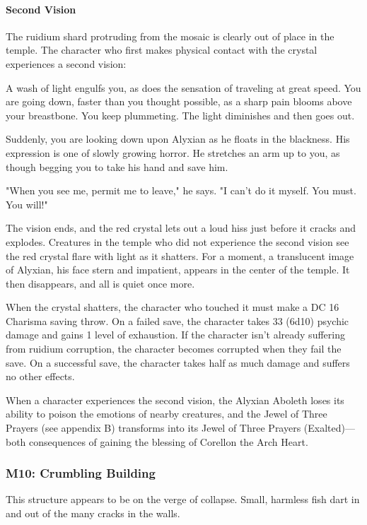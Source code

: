 \documentclass[10pt,a4paper,twoside,twocolumn,openany,nodeprecatedcode]{dndbook}
\begin{document}
\paragraph{Second Vision}
The ruidium shard protruding from the mosaic is clearly out of place in the temple. The character who first makes physical contact with the crystal experiences a second vision:

\begin{DndReadAloud}{}
A wash of light engulfs you, as does the sensation of traveling at great speed. You are going down, faster than you thought possible, as a sharp pain blooms above your breastbone. You keep plummeting. The light diminishes and then goes out.

Suddenly, you are looking down upon Alyxian as he floats in the blackness. His expression is one of slowly growing horror. He stretches an arm up to you, as though begging you to take his hand and save him.

"When you see me, permit me to leave," he says. "I can't do it myself. You must. You will!"

\end{DndReadAloud}

The vision ends, and the red crystal lets out a loud hiss just before it cracks and explodes. Creatures in the temple who did not experience the second vision see the red crystal flare with light as it shatters. For a moment, a translucent image of Alyxian, his face stern and impatient, appears in the center of the temple. It then disappears, and all is quiet once more.

When the crystal shatters, the character who touched it must make a DC 16 Charisma saving throw. On a failed save, the character takes 33 (6d10) psychic damage and gains 1 level of exhaustion. If the character isn't already suffering from ruidium corruption, the character becomes corrupted when they fail the save. On a successful save, the character takes half as much damage and suffers no other effects.

When a character experiences the second vision, the Alyxian Aboleth loses its ability to poison the emotions of nearby creatures, and the Jewel of Three Prayers (see appendix B) transforms into its Jewel of Three Prayers (Exalted)—both consequences of gaining the blessing of Corellon the Arch Heart.

\subsubsection{M10: Crumbling Building}
This structure appears to be on the verge of collapse. Small, harmless fish dart in and out of the many cracks in the walls.
\end{document}

